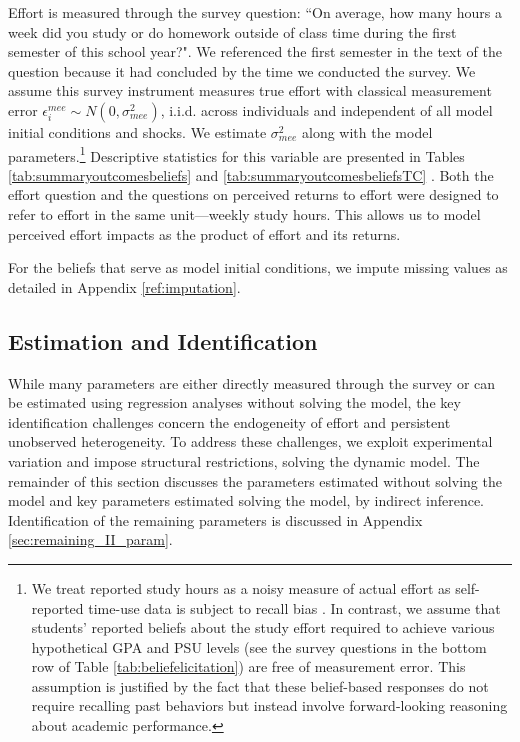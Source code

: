 Effort is measured through the survey question: ``On average, how many hours a week did you study or do homework outside of class time during the first semester of this school year?". We referenced the first semester in the text of the question because it had concluded by the time we conducted the survey. We assume this survey instrument measures true effort with classical measurement error $\epsilon_i^{mee}\sim N(0,\sigma^2_{mee})$, i.i.d. across individuals and independent of all model initial conditions and shocks. We estimate $\sigma^2_{mee}$ along with the model parameters.\footnote{We treat reported study hours as a noisy measure of actual effort as self-reported time-use data is subject to recall bias \citep{bound2001measurement}. In contrast, we assume that students' reported beliefs about the study effort required to achieve various hypothetical GPA and PSU levels (see the survey questions in the bottom row of Table \ref{tab:beliefelicitation}) are free of measurement error. This assumption is justified by the fact that these belief-based responses do not require recalling past behaviors but instead involve forward-looking reasoning about academic performance. } Descriptive statistics for this variable are presented in Tables \ref{tab:summaryoutcomesbeliefs} and \ref{tab:summaryoutcomesbeliefsTC} . Both the effort question and the questions on perceived returns to effort were designed to refer to effort in the same unit---weekly study hours. This allows us to model perceived effort impacts as the product of effort and its returns.    \par 

For the beliefs that serve as model initial conditions, we impute missing values as detailed in Appendix \ref{ref:imputation}.






\subsection{Estimation and Identification}\label{sec:paramoutside}
While many parameters are either directly measured through the survey or can be estimated using regression analyses without solving the model, the key identification challenges concern the endogeneity of effort and persistent unobserved heterogeneity. To address these challenges, we exploit experimental variation and impose structural restrictions, solving the dynamic model. The remainder of this section discusses the parameters estimated without solving the model and key parameters estimated solving the model, by indirect inference. Identification of the remaining parameters is discussed in Appendix \ref{sec:remaining_II_param}.\par 


